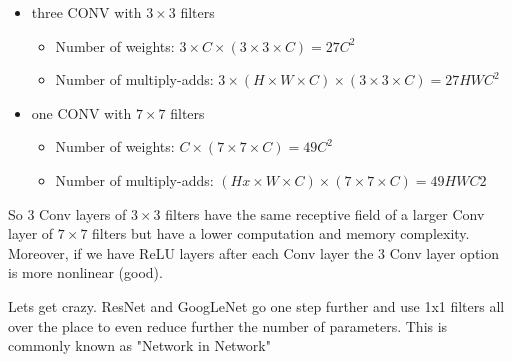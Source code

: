 \begin{itemize}
\item three CONV with $3 \times 3$ filters
\begin{itemize}
\item Number of weights: $3 \times C \times (3 \times 3 \times C) = 27C^2$
\item Number of multiply-adds: $3 \times (H \times W \times C) \times (3 \times 3 \times C) = 27 HWC^2$
\end{itemize}
\item one CONV with $7 \times 7$ filters
\begin{itemize}
\item Number of weights: $C \times (7 \times 7 \times C) = 49C^2$
\item Number of multiply-adds: $(H x\times W \times C) \times (7 \times 7 \times C) = 49HWC2$
\end{itemize}
\end{itemize}


So 3 Conv layers of $3 \times 3$ filters have the same receptive field of a larger Conv layer of $7 \times 7$ filters but have a lower computation and memory complexity. Moreover, if we have ReLU layers after each Conv layer the 3 Conv layer option is more nonlinear (good).

Lets get crazy. ResNet and GoogLeNet go one step further and use 1x1 filters all over the place to even reduce further the number of parameters. This is commonly known as "Network in Network"

